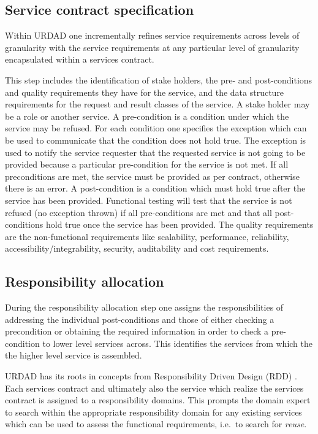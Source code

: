 \subsection{Service contract specification}

Within URDAD one incrementally refines service requirements across levels of granularity with the service requirements at any particular level of granularity encapsulated within a services contract.

This step includes the identification of stake holders, the pre- and post-conditions and quality requirements they have for the service, and the  data structure requirements for the request and result classes of the service. A stake holder may be a role or another service. A pre-condition is a condition under which the service may be refused. For each condition one specifies the exception which can be used to communicate that the condition does not hold true. The exception is used to notify the service requester that the requested service is not going to be provided because a particular pre-condition for the service is not met. If all preconditions are met, the service must be provided as per contract, otherwise there is an error. A post-condition is a condition which must hold true after the service has been provided. Functional testing will test that the service is not refused (no exception thrown) if all pre-conditions are met and that all post-conditions hold true once the service has been provided. The quality requirements are the non-functional requirements like scalability, performance, reliability, accessibility/integrability, security, auditability and cost requirements. 

\subsection{Responsibility allocation}

During the responsibility allocation step one assigns the responsibilities of addressing the individual post-conditions and those of either checking a precondition or obtaining the required information in order to check a pre-condition to lower level services across. This identifies the services from which the the higher level service is assembled.

URDAD has its roots in concepts from Responsibility Driven Design (RDD) \cite{wirfs-brock_object-oriented_1989,wirfs-brock_object_2002}. Each services contract and ultimately also the service which realize the services contract is assigned to a responsibility domains. This prompts the domain expert to search within the appropriate responsibility domain for any existing services which can be used to assess the functional requirements, i.e.\ to search for \emph{reuse}.

